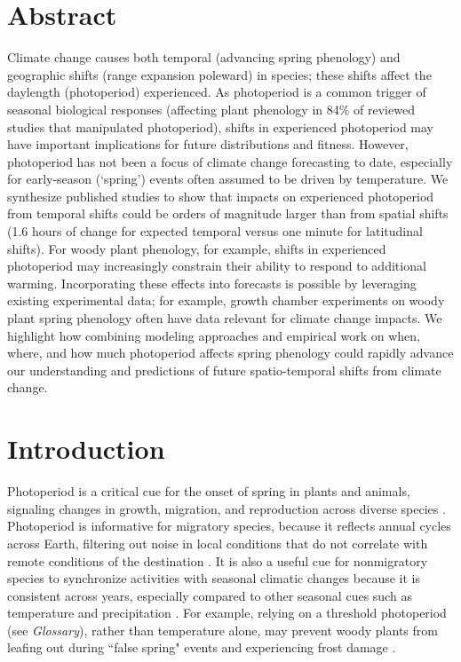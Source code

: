 \documentclass{article}
\begin{document}
\section*{Abstract}
Climate change causes both temporal (advancing spring phenology) and geographic shifts (range expansion poleward) in species; these shifts affect the daylength (photoperiod) experienced. As photoperiod is a common trigger of seasonal biological responses (affecting plant phenology in 84\% of reviewed studies that manipulated photoperiod), shifts in experienced photoperiod may have important implications for future distributions and fitness. However, photoperiod has not been a focus of climate change forecasting to date, especially for early-season (`spring') events often assumed to be driven by temperature. We synthesize published studies to show that impacts on experienced photoperiod from temporal shifts could be orders of magnitude larger than from spatial shifts (1.6 hours of change for expected temporal versus one minute for latitudinal shifts). For woody plant phenology, for example, shifts in experienced photoperiod may increasingly constrain their ability to respond to additional warming. Incorporating these effects into forecasts is possible by leveraging existing experimental data; for example, growth chamber experiments on woody plant spring phenology often have data relevant for climate change impacts. We highlight how combining modeling approaches and empirical work on when, where, and how much photoperiod affects spring phenology could rapidly advance our understanding and predictions of future spatio-temporal shifts from climate change. %


\newpage
\section*{Introduction}
\par Photoperiod is a critical cue for the onset of spring in plants and animals, signaling changes in growth, migration, and reproduction across diverse species \citep[e.g.,][]{flynn2018,Howe:1996,lagercrantz2009,bradshaw2007,mcallan2006,solbakken1994,barker1976, farner1964}. Photoperiod is informative for migratory species,  because it reflects annual cycles across Earth, filtering out noise in local conditions that do not correlate with remote conditions of the destination \citep{winkler2014}. It is also a useful cue for nonmigratory species to synchronize activities with seasonal climatic changes \citep[e.g.,][]{Singh:2017, Basler:2012, Hsu:2011} because it is consistent across years, especially compared to other seasonal cues such as temperature and precipitation \citep{saikkonen2012}. For example, relying on a threshold photoperiod (see \emph{Glossary}), rather than temperature alone, may prevent woody plants from leafing out during ``false spring" events and experiencing frost damage \citep[unusually warm periods during winter that are followed by a return of cold temperatures,][] {Gu2008}. 
\end{document}
